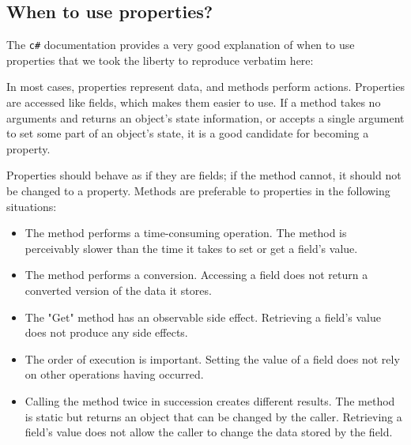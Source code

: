 \subsection{When to use properties?}

The \lstinline{c#} documentation provides a very good explanation of when to use
properties that we took the liberty to reproduce verbatim here:

In most cases, properties represent data, and methods perform actions.
Properties are accessed like fields, which makes them easier to use.
If a method takes no arguments and returns an object's state information,
or accepts a single argument to set some part of an object's state,
it is a good candidate for becoming a property.

Properties should behave as if they are fields; if the method cannot,
it should not be changed to a property.
Methods are preferable to properties in the following situations:

\begin{itemize}
\item The method performs a time-consuming operation. The method is perceivably slower than the time it takes to set or get a field's value.
\item The method performs a conversion. Accessing a field does not return a converted version of the data it stores.
\item The "Get" method has an observable side effect. Retrieving a field's value does not produce any side effects.
\item The order of execution is important. Setting the value of a field does not rely on other operations having occurred.
\item Calling the method twice in succession creates different results.
The method is static but returns an object that can be changed by the caller. Retrieving a field's value does not allow the caller to change the data stored by the field.

\end{itemize}
